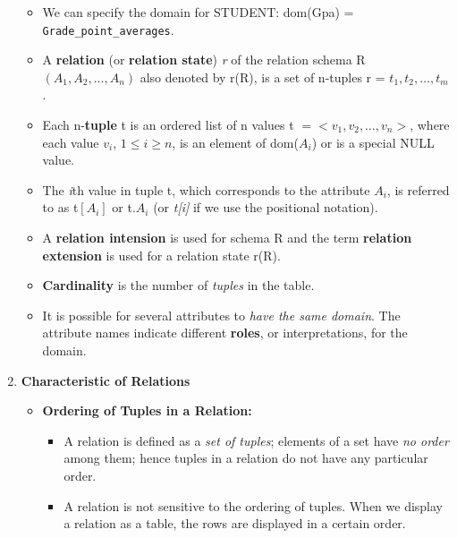 \documentclass[10pt]{article}
\begin{document}
\begin{enumerate}
\begin{itemize}
		\item We can specify the domain for STUDENT: dom(Gpa) = \texttt{Grade\_point\_averages}.
		\item A \textbf{relation} (or \textbf{relation state}) \textit{r} of the relation schema R$(A_1, A_2, \ldots, A_n)$ also denoted by r(R), is a set of n-tuples r = ${t_1, t_2, \ldots, t_m}$.
		\item Each n-\textbf{tuple} t is an ordered list of n values t $=<v_1, v_2, \ldots, v_n>$, where each value $v_i$, $1 \le i \ge n$, is an element of dom($A_{i}$) or is a special NULL value.
		\item The \textit{i}th value in tuple t, which corresponds to the attribute $A_{i}$, is referred to as t$[A_{i}]$ or t.$A_{i}$ (or \textit{t[i]} if we use the positional notation).
		\item A \textbf{relation intension} is used for schema R and the term \textbf{relation extension} is used for a relation state r(R).
		\item \textbf{Cardinality} is the number of \textit{tuples} in the table.
		\item It is possible for several attributes to \textit{have the same domain}. The attribute names indicate different \textbf{roles}, or interpretations, for the domain.
	\end{itemize}

	\item \textbf{Characteristic of Relations}
	\begin{itemize}
		\item \textbf{Ordering of Tuples in a Relation: }
		\begin{itemize}
			\item A relation is defined as a \textit{set of tuples}; elements of a set have \textit{no order} among them; hence tuples in a relation do not have any particular order.
			\item A relation is not sensitive to the ordering of tuples. When we display a relation as a table, the rows are displayed in a certain order. 
		\end{itemize}


\end{itemize}
\end{enumerate}
\end{document}
